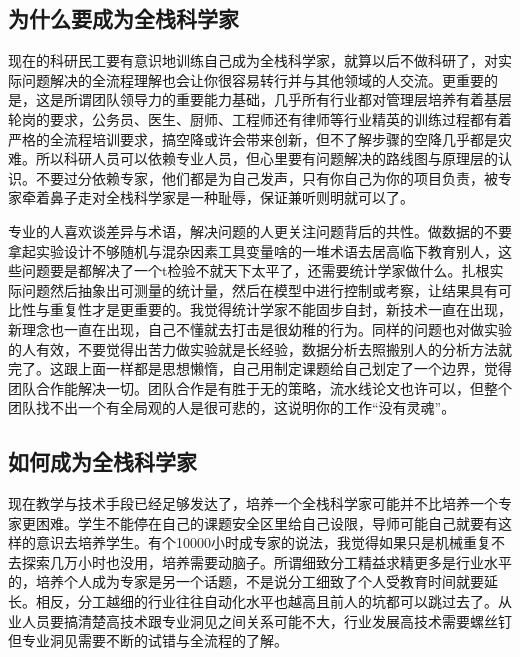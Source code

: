 \documentclass[]{book}
\begin{document}
\hypertarget{ux4e3aux4ec0ux4e48ux8981ux6210ux4e3aux5168ux6808ux79d1ux5b66ux5bb6}{%
\subsection{为什么要成为全栈科学家}\label{ux4e3aux4ec0ux4e48ux8981ux6210ux4e3aux5168ux6808ux79d1ux5b66ux5bb6}}

现在的科研民工要有意识地训练自己成为全栈科学家，就算以后不做科研了，对实际问题解决的全流程理解也会让你很容易转行并与其他领域的人交流。更重要的是，这是所谓团队领导力的重要能力基础，几乎所有行业都对管理层培养有着基层轮岗的要求，公务员、医生、厨师、工程师还有律师等行业精英的训练过程都有着严格的全流程培训要求，搞空降或许会带来创新，但不了解步骤的空降几乎都是灾难。所以科研人员可以依赖专业人员，但心里要有问题解决的路线图与原理层的认识。不要过分依赖专家，他们都是为自己发声，只有你自己为你的项目负责，被专家牵着鼻子走对全栈科学家是一种耻辱，保证兼听则明就可以了。

专业的人喜欢谈差异与术语，解决问题的人更关注问题背后的共性。做数据的不要拿起实验设计不够随机与混杂因素工具变量啥的一堆术语去居高临下教育别人，这些问题要是都解决了一个t检验不就天下太平了，还需要统计学家做什么。扎根实际问题然后抽象出可测量的统计量，然后在模型中进行控制或考察，让结果具有可比性与重复性才是更重要的。我觉得统计学家不能固步自封，新技术一直在出现，新理念也一直在出现，自己不懂就去打击是很幼稚的行为。同样的问题也对做实验的人有效，不要觉得出苦力做实验就是长经验，数据分析去照搬别人的分析方法就完了。这跟上面一样都是思想懒惰，自己用制定课题给自己划定了一个边界，觉得团队合作能解决一切。团队合作是有胜于无的策略，流水线论文也许可以，但整个团队找不出一个有全局观的人是很可悲的，这说明你的工作``没有灵魂''。

\hypertarget{ux5982ux4f55ux6210ux4e3aux5168ux6808ux79d1ux5b66ux5bb6}{%
\subsection{如何成为全栈科学家}\label{ux5982ux4f55ux6210ux4e3aux5168ux6808ux79d1ux5b66ux5bb6}}

现在教学与技术手段已经足够发达了，培养一个全栈科学家可能并不比培养一个专家更困难。学生不能停在自己的课题安全区里给自己设限，导师可能自己就要有这样的意识去培养学生。有个10000小时成专家的说法，我觉得如果只是机械重复不去探索几万小时也没用，培养需要动脑子。所谓细致分工精益求精更多是行业水平的，培养个人成为专家是另一个话题，不是说分工细致了个人受教育时间就要延长。相反，分工越细的行业往往自动化水平也越高且前人的坑都可以跳过去了。从业人员要搞清楚高技术跟专业洞见之间关系可能不大，行业发展高技术需要螺丝钉但专业洞见需要不断的试错与全流程的了解。
\end{document}
